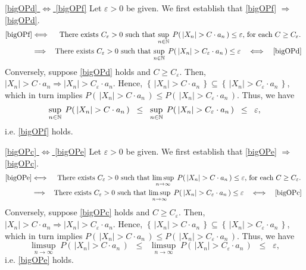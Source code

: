 \vskip 0.3cm
\noindent
\underline{\eqref{bigOPd} $\Longleftrightarrow$ \eqref{bigOPf}}\quad
Let $\varepsilon > 0$ be given.
We first establish that \eqref{bigOPf} $\Longrightarrow$ \eqref{bigOPd}.
\begin{eqnarray*}
\eqref{bigOPf}
&\Longleftrightarrow&
\textnormal{There exists $C_{\varepsilon} > 0$ such that
$\sup_{n \in \mathbb{N}}\;P\!\left(\,|X_{n}| > C \cdot a_{n}\,\right) \leq \varepsilon$,
for each $C \geq C_{\varepsilon}$.
}
\\
&\Longrightarrow&
\textnormal{There exists $C_{\varepsilon} > 0$ such that
$\sup_{n \in \mathbb{N}}\;P\!\left(\,|X_{n}| > C_{\varepsilon} \cdot a_{n}\,\right) \leq \varepsilon
\quad\Longleftrightarrow\quad \eqref{bigOPd}$
}
\end{eqnarray*}
Conversely, suppose \eqref{bigOPd} holds and $C \geq C_{\varepsilon}$.
Then, $|X_{n}| > C \cdot a_{n} \Longrightarrow |X_{n}| > C_{\varepsilon} \cdot a_{n}$.
Hence, $\left\{\,|X_{n}| > C \cdot a_{n}\,\right\} \subseteq \left\{\,|X_{n}| > C_{\varepsilon} \cdot a_{n}\,\right\}$,
which in turn implies $P\!\left(\,|X_{n}| > C \cdot a_{n}\,\right) \leq P\!\left(\,|X_{n}| > C_{\varepsilon} \cdot a_{n}\,\right)$.
Thus, we have
\begin{equation*}
\sup_{n\in\mathbb{N}}\;P\!\left(\,|X_{n}| > C \cdot a_{n}\,\right)
\;\;\leq\;\;
\sup_{n\in\mathbb{N}}\;P\!\left(\,|X_{n}| > C_{\varepsilon} \cdot a_{n}\,\right)
\;\;\leq\;\;
\varepsilon,
\end{equation*}
i.e. \eqref{bigOPf} holds.

\vskip 0.3cm
\noindent
\underline{\eqref{bigOPc} $\Longleftrightarrow$ \eqref{bigOPe}}\quad
Let $\varepsilon > 0$ be given.
We first establish that \eqref{bigOPe} $\Longrightarrow$ \eqref{bigOPc}.
\begin{eqnarray*}
\eqref{bigOPe}
&\Longleftrightarrow&
\textnormal{There exists $C_{\varepsilon} > 0$ such that
$\limsup_{n\rightarrow\infty}\;P\!\left(\,|X_{n}| > C \cdot a_{n}\,\right) \leq \varepsilon$,
for each $C \geq C_{\varepsilon}$.
}
\\
&\Longrightarrow&
\textnormal{There exists $C_{\varepsilon} > 0$ such that
$\limsup_{n\rightarrow\infty}\;P\!\left(\,|X_{n}| > C_{\varepsilon} \cdot a_{n}\,\right) \leq \varepsilon
\quad\Longleftrightarrow\quad \eqref{bigOPc}$
}
\end{eqnarray*}
Conversely, suppose \eqref{bigOPc} holds and $C \geq C_{\varepsilon}$.
Then, $|X_{n}| > C \cdot a_{n} \Longrightarrow |X_{n}| > C_{\varepsilon} \cdot a_{n}$.
Hence, $\left\{\,|X_{n}| > C \cdot a_{n}\,\right\} \subseteq \left\{\,|X_{n}| > C_{\varepsilon} \cdot a_{n}\,\right\}$,
which in turn implies $P\!\left(\,|X_{n}| > C \cdot a_{n}\,\right) \leq P\!\left(\,|X_{n}| > C_{\varepsilon} \cdot a_{n}\,\right)$.
Thus, we have
\begin{equation*}
\limsup_{n\rightarrow\infty}\;P\!\left(\,|X_{n}| > C \cdot a_{n}\,\right)
\;\;\leq\;\;
\limsup_{n\rightarrow\infty}\;P\!\left(\,|X_{n}| > C_{\varepsilon} \cdot a_{n}\,\right)
\;\;\leq\;\;
\varepsilon,
\end{equation*}
i.e. \eqref{bigOPe} holds.

